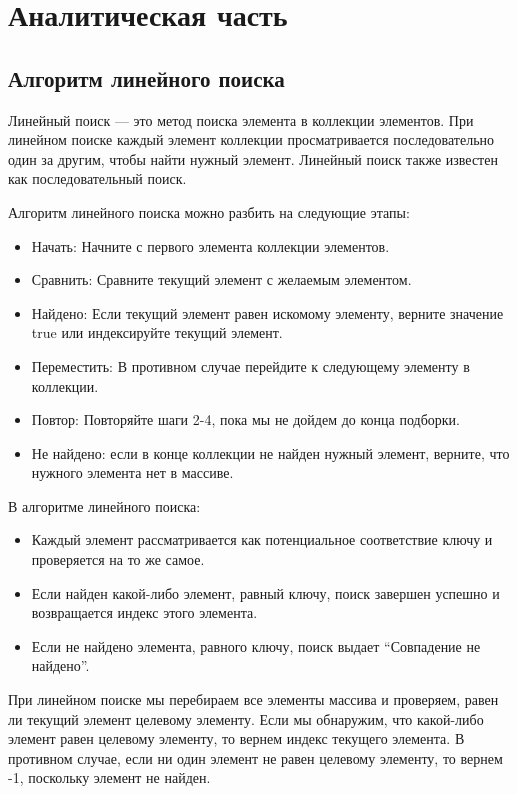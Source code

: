 \section{Аналитическая часть}

\subsection{Алгоритм линейного поиска}

\hspace{1.25cm}
Линейный поиск --- это метод поиска элемента в коллекции элементов. При линейном поиске каждый элемент коллекции просматривается последовательно один за другим, чтобы найти нужный элемент. Линейный поиск также известен как последовательный поиск.

Алгоритм линейного поиска можно разбить на следующие этапы:
\begin{itemize}
\item Начать: Начните с первого элемента коллекции элементов.
\item Сравнить: Сравните текущий элемент с желаемым элементом.
\item Найдено: Если текущий элемент равен искомому элементу, верните значение true или индексируйте текущий элемент.
\item Переместить: В противном случае перейдите к следующему элементу в коллекции.
\item Повтор: Повторяйте шаги 2-4, пока мы не дойдем до конца подборки.
\item Не найдено: если в конце коллекции не найден нужный элемент, верните, что нужного элемента нет в массиве.
\end{itemize}

В алгоритме линейного поиска:
\begin{itemize}
\item Каждый элемент рассматривается как потенциальное соответствие ключу и проверяется на то же самое.
\item Если найден какой-либо элемент, равный ключу, поиск завершен успешно и возвращается индекс этого элемента.
\item Если не найдено элемента, равного ключу, поиск выдает “Совпадение не найдено”.
\end{itemize}

При линейном поиске мы перебираем все элементы массива и проверяем, равен ли текущий элемент целевому элементу. Если мы обнаружим, что какой-либо элемент равен целевому элементу, то вернем индекс текущего элемента. В противном случае, если ни один элемент не равен целевому элементу, то вернем -1, поскольку элемент не найден.

